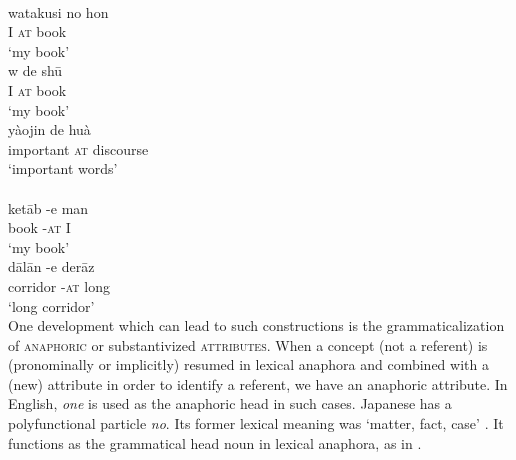 \ea\label{ex:E37}
\langinfo{\LangJap}{}{}\\
\gll watakusi  no  hon  \\
 I  \textsc{at}  book\\
\glt   ‘my book’
\z
\noindent \ea\label{ex:E38}
\langinfo{\LangMand}{}{}  \\
 \ea
 \gll  w  de  sh\=u  \\
 I  \textsc{at}  book  \\
\glt ‘my book’\\
\ex
\gll  yàojin  de  huà  \\
 important  \textsc{at}  discourse \\
 \glt ‘important words’\\
\z
\z
\noindent  \ea\label{ex:E39}
    \\
 \ea
 \gll  ket\=ab  {}-e  man  \\
book  {}-\textsc{at}  I \\
\glt ‘my book’\\
\ex
\gll  d\=al\=an  {}-e  der\=az  \\
 corridor  {}-\textsc{at}  long\\
 \glt 
 ‘long corridor’\\
\z
\z
\noindent One development which can lead to such constructions is the grammaticalization of \textsc{anaphoric} or substantivized \textsc{attributes}. When a concept (not a referent) is (pronominally or implicitly) resumed in lexical anaphora and combined with a (new) attribute in order to identify a referent, we have an anaphoric attribute. In English, \textit{one} is used as the anaphoric head in such cases.\label{page74} Japanese has a polyfunctional particle \textit{no}. Its former lexical meaning was ‘matter, fact, case’ \citep[99]{Jorden1962}. It functions as the grammatical head noun in lexical anaphora, as in . 

